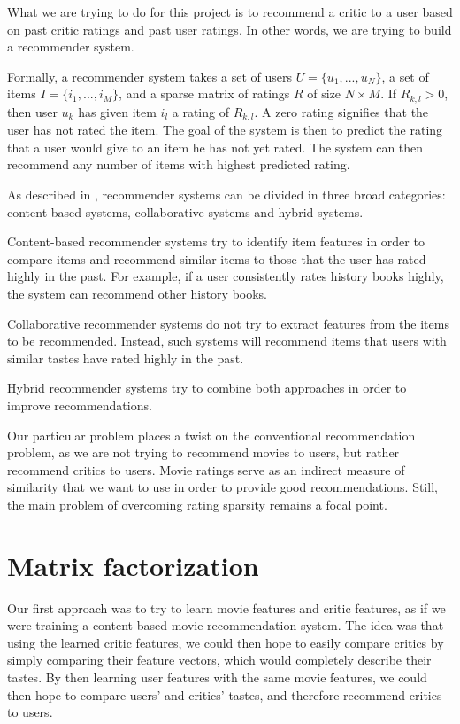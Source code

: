 \documentclass[12pt]{article}
\begin{document}
	What we are trying to do for this project is to recommend a critic to a user based on past critic ratings and past user ratings. In other words, we are trying to build a recommender system.

	Formally, a recommender system takes a set of users $U = \{u_1, ..., u_N\}$, a
	set of items $I = \{i_1, ..., i_M\}$, and a sparse matrix of ratings
	$R$ of size $N \times M$. If $R_{k,l} > 0$, then user $u_k$ has given item $i_l$ a rating of $R_{k,l}$. A zero rating signifies that the
	user has not rated the item. The goal of the system is then to predict the rating that a user would give to an item he has not yet rated. The system can
	then recommend any number of items with highest predicted rating.

	As described in \cite{Survey05}, recommender systems can be divided in three broad categories: content-based systems, collaborative systems and hybrid systems. 

	Content-based recommender systems try to identify item features in order to compare items and recommend similar items to those that the user has rated highly in the past.  For example, if a user consistently rates history books highly, the system can recommend other history books.

	Collaborative recommender systems do not try to extract features from the items
	to be recommended. Instead, such systems will recommend items that users with similar tastes have rated highly in the past.

	Hybrid recommender systems try to combine both approaches in order to improve recommendations.

	Our particular problem places a twist on the conventional recommendation problem, as we are not trying to recommend movies to users, but rather recommend critics to users. Movie ratings serve as an indirect measure of similarity that we want to use in order to provide good recommendations. Still, the main problem of overcoming rating sparsity remains a focal point.

\section{Matrix factorization}

	Our first approach was to try to learn movie features and critic features, as if we were training a content-based movie recommendation system. The idea was that using the learned critic features, we could then hope to easily compare critics by simply comparing their feature vectors, which would completely describe their tastes. By then learning user features with the same movie features, we could then hope to compare users' and critics' tastes, and therefore recommend critics to users. 
\end{document}
